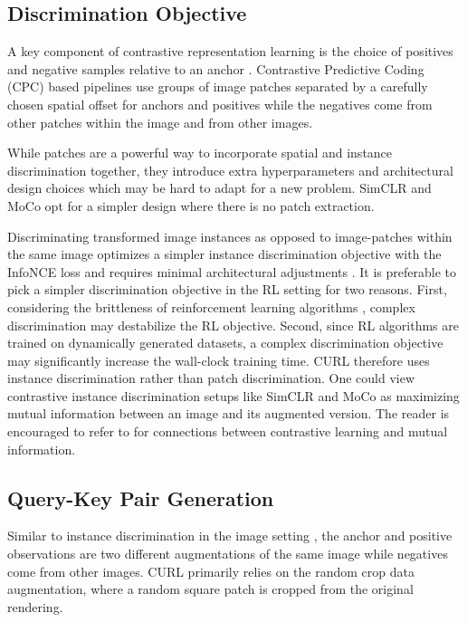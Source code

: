 \documentclass{article}
\begin{document}
\subsection{Discrimination Objective}
A key component of contrastive representation learning is the choice of positives and negative samples relative to an anchor \cite{bachman2019learning, tian2019contrastive, henaff2019data, he2019momentum, chen2020simclr}. Contrastive Predictive Coding (CPC) based pipelines \cite{henaff2019data, oord2018representation} use groups of image patches separated by a carefully chosen spatial offset for anchors and positives while the negatives come from other patches within the image and from other images. 

While patches are a powerful way to incorporate spatial and instance discrimination together, they introduce extra hyperparameters and architectural design choices which may be hard to adapt for a new problem. SimCLR \cite{chen2020simclr} and MoCo \cite{he2019momentum} opt for a simpler design where there is no patch extraction. 

Discriminating transformed image instances as opposed to image-patches within the same image optimizes a simpler instance discrimination objective \cite{wu2018unsupervised} with the InfoNCE loss and requires minimal architectural adjustments \cite{kaiming2019moco, chen2020simclr}. It is preferable to pick a simpler discrimination objective in the RL setting for two reasons. First, considering the brittleness of reinforcement learning algorithms \cite{henderson2018deep}, complex discrimination may destabilize the RL objective. Second, since RL algorithms are trained on dynamically generated datasets, a complex discrimination objective may significantly increase the wall-clock training time. CURL therefore uses instance discrimination rather than patch discrimination.  One could view contrastive instance discrimination setups like SimCLR and MoCo as maximizing mutual information between an image and its augmented version. The reader is encouraged to refer to \citet{oord2018representation, hjelm2018learning, tschannen2019mutual} for connections between contrastive learning and mutual information. 


\subsection{Query-Key Pair Generation}
Similar to instance discrimination in the image setting \cite{kaiming2019moco, chen2020simclr}, the anchor and positive observations are two different augmentations of the same image while negatives come from other images. CURL primarily relies on the random crop data augmentation, where a random square patch is cropped from the original rendering.
\end{document}
